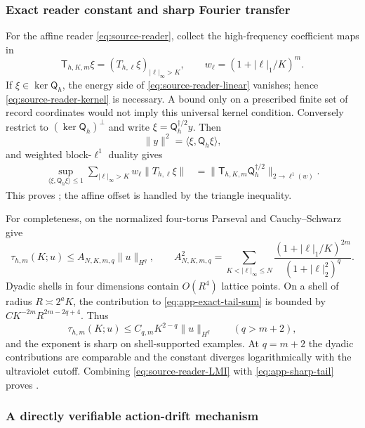 \documentclass[11pt]{article}
\numberwithin{equation}{section}
\theoremstyle{definition}
\theoremstyle{remark}
\newcommand{\norm}[1]{\lVert#1\rVert}
\newcommand{\ip}[2]{\langle#1,#2\rangle}
\begin{document}
\subsubsection{Exact reader constant and sharp Fourier transfer}
\label{app:native-reader-proof}

For the affine reader \eqref{eq:source-reader}, collect the high-frequency coefficient maps in
\[
 \mathsf T_{h,K,m}\xi=(T_{h,\ell}\xi)_{|\ell|_\infty>K},
 \qquad w_\ell=(1+|\ell|_1/K)^m.
\]
If $\xi\in\ker\mathsf Q_h$, the energy side of \eqref{eq:source-reader-linear} vanishes; hence \eqref{eq:source-reader-kernel} is necessary.  A bound only on a prescribed finite set of record coordinates would not imply this universal kernel condition.  Conversely restrict to $(\ker\mathsf Q_h)^\perp$ and write $\xi=\mathsf Q_h^{\dagger/2}y$.  Then
\[
 \norm y^2=\ip{\xi}{\mathsf Q_h\xi},
\]
and weighted block-$\ell^1$ duality gives
\begin{align}
 \sup_{\ip{\xi}{\mathsf Q_h\xi}\le1}
 \sum_{|\ell|_\infty>K}w_\ell\norm{T_{h,\ell}\xi}
 &=\norm{\mathsf T_{h,K,m}\mathsf Q_h^{\dagger/2}}_{2\to\ell^1(w)}.
 \label{eq:app-reader-dual}
\end{align}
This proves ; the affine offset is handled by the triangle inequality.

For completeness, on the normalized four-torus Parseval and Cauchy--Schwarz give
\begin{equation}
 \tau_{h,m}(K;u)
 \le A_{N,K,m,q}\norm u_{H^q},\qquad
 A_{N,K,m,q}^2=
 \sum_{K<|\ell|_\infty\le N}
 \frac{(1+|\ell|_1/K)^{2m}}{(1+|\ell|_2^2)^q}.
 \label{eq:app-exact-tail-sum}
\end{equation}
Dyadic shells in four dimensions contain $O(R^4)$ lattice points.  On a shell of radius $R\asymp2^aK$, the contribution to \eqref{eq:app-exact-tail-sum} is bounded by $CK^{-2m}R^{2m-2q+4}$.  Thus
\begin{equation}
 \tau_{h,m}(K;u)\le C_{q,m}K^{2-q}\norm u_{H^q}
 \qquad(q>m+2),
 \label{eq:app-sharp-tail}
\end{equation}
and the exponent is sharp on shell-supported examples.  At $q=m+2$ the dyadic contributions are comparable and the constant diverges logarithmically with the ultraviolet cutoff.  Combining \eqref{eq:source-reader-LMI} with \eqref{eq:app-sharp-tail} proves .

\subsubsection{A directly verifiable action-drift mechanism}
\end{document}
